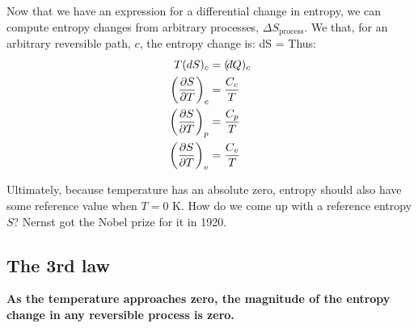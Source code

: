 \documentclass[12pt]{article}
\def\dbar{{\mathchar'26\mkern-12mu d}}
\begin{document}

Now that we have an expression for a differential change in entropy, we can compute  entropy changes from arbitrary processes, $\Delta S_{\text{process}}$.  We that, for an arbitrary reversible path, $c$, the entropy change is:
\beq dS = \frac{(\dbar Q)_c}{T} \ceq
Thus:
\begin{align*}
T(dS)_c &= (\dbar Q)_c\\
\left(\frac{\partial S}{\partial T}\right)_c &= \frac{C_c}{T} \\
\left(\frac{\partial S}{\partial T}\right)_p &= \frac{C_p}{T}\\
\left(\frac{\partial S}{\partial T}\right)_v &= \frac{C_v}{T}\\
\end{align*}

Ultimately, because temperature has an absolute zero, entropy should also have some reference value when $T=0$ K.  How do we come up with a reference entropy $S$?  Nernst got the Nobel prize for it in 1920.

\subsection{The 3rd law}
\textbf{As the temperature approaches zero, the magnitude of the entropy change in any reversible process is zero.}
\end{document}
